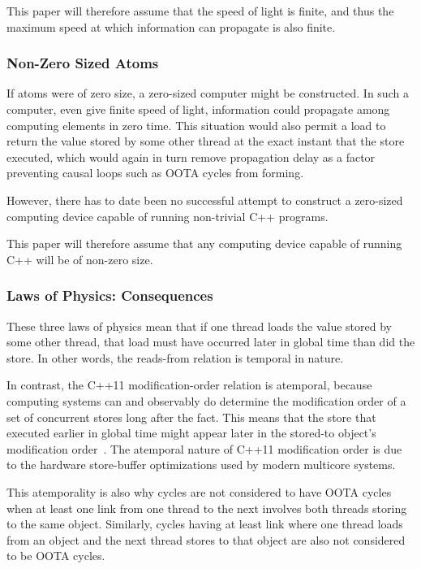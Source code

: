 \documentclass[10]{article}
\begin{document}
This paper will therefore assume that the speed of light is finite, and
thus the maximum speed at which information can propagate is also finite.

\subsubsection{Non-Zero Sized Atoms}
\label{sec:Non-Zero Sized Atoms}

If atoms were of zero size, a zero-sized computer might be constructed.
In such a computer, even give finite speed of light, information could
propagate among computing elements in zero time.
This situation would also permit a load to return the value stored by
some other thread at the exact instant that the store executed, which
would again in turn remove propagation delay as a factor preventing
causal loops such as OOTA cycles from forming.

However, there has to date been no successful attempt to construct a
zero-sized computing device capable of running non-trivial C++ programs.

This paper will therefore assume that any computing device capable of
running C++ will be of non-zero size.

\subsubsection{Laws of Physics: Consequences}
\label{sec:Laws of Physics: Consequences}

These three laws of physics mean that if one thread loads the value
stored by some other thread, that load must have occurred later
in global time than did the store.
In other words, the reads-from relation is temporal in nature.

In contrast, the C++11 modification-order relation is atemporal,
because computing systems can and observably do determine the
modification order of a set of concurrent stores long after the fact.
This means that the store that executed earlier in global time
might appear later in the stored-to object's modification
order~\cite{McKenney20xxParallelProgramming}.
The atemporal nature of C++11 modification order is due to the hardware
store-buffer optimizations used by modern multicore systems.

This atemporality is also why cycles are not considered to have
OOTA cycles when at least one link from one thread to the next
involves both threads storing to the same object.
Similarly, cycles having at least link where one thread loads from an
object and the next thread stores to that object are also not considered
to be OOTA cycles.
\end{document}
